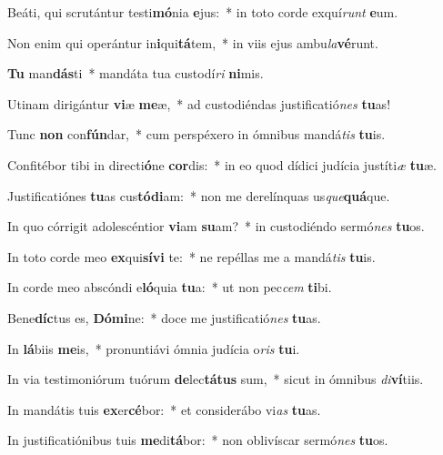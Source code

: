\item Beáti, qui scrutántur testi\textbf{mó}nia \textbf{e}jus:~* in toto corde exquí\textit{runt} \textbf{e}um.
\item Non enim qui operántur in\textbf{i}qui\textbf{tá}tem,~* in viis ejus ambu\textit{la}\textbf{vé}runt.
\item \textbf{Tu} man\textbf{dás}ti~* mandáta tua custodí\textit{ri} \textbf{ni}mis.
\item Utinam dirigántur \textbf{vi}æ \textbf{me}æ,~* ad custodiéndas justificatió\textit{nes} \textbf{tu}as!
\item Tunc \textbf{non} con\textbf{fún}dar,~* cum perspéxero in ómnibus mandá\textit{tis} \textbf{tu}is.
\item Confitébor tibi in directi\textbf{ó}ne \textbf{cor}dis:~* in eo quod dídici judícia justíti\textit{æ} \textbf{tu}æ.
\item Justificatiónes \textbf{tu}as cus\textbf{tó}\textbf{di}am:~* non me derelínquas us\textit{que}\textbf{quá}que.
\item In quo córrigit adolescéntior \textbf{vi}am \textbf{su}am?~* in custodiéndo sermó\textit{nes} \textbf{tu}os.
\item In toto corde meo \textbf{ex}qui\textbf{sí}\textbf{vi} te:~* ne repéllas me a mandá\textit{tis} \textbf{tu}is.
\item In corde meo abscóndi e\textbf{ló}quia \textbf{tu}a:~* ut non pec\textit{cem} \textbf{ti}bi.
\item Bene\textbf{díc}tus es, \textbf{Dó}\textbf{mi}ne:~* doce me justificatió\textit{nes} \textbf{tu}as.
\item In \textbf{lá}biis \textbf{me}is,~* pronuntiávi ómnia judícia o\textit{ris} \textbf{tu}i.
\item In via testimoniórum tuórum \textbf{de}lec\textbf{tá}\textbf{tus} sum,~* sicut in ómnibus \textit{di}\textbf{ví}tiis.
\item In mandátis tuis \textbf{ex}er\textbf{cé}bor:~* et considerábo vi\textit{as} \textbf{tu}as.
\item In justificatiónibus tuis \textbf{me}di\textbf{tá}bor:~* non oblivíscar sermó\textit{nes} \textbf{tu}os.
